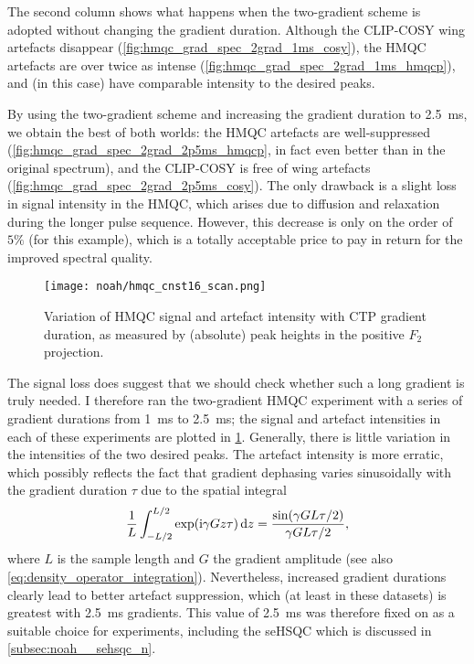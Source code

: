 The second column shows what happens when the two-gradient scheme is adopted without changing the gradient duration.
Although the CLIP-COSY wing artefacts disappear (\cref{fig:hmqc_grad_spec_2grad_1ms_cosy}), the HMQC artefacts are over twice as intense (\cref{fig:hmqc_grad_spec_2grad_1ms_hmqcp}), and (in this case) have comparable intensity to the desired peaks.

By using the two-gradient scheme and increasing the gradient duration to \qty{2.5}{\ms}, we obtain the best of both worlds: the HMQC artefacts are well-suppressed (\cref{fig:hmqc_grad_spec_2grad_2p5ms_hmqcp}, in fact even better than in the original spectrum), and the CLIP-COSY is free of wing artefacts (\cref{fig:hmqc_grad_spec_2grad_2p5ms_cosy}).
The only drawback is a slight loss in signal intensity in the HMQC, which arises due to diffusion and relaxation during the longer pulse sequence.
However, this decrease is only on the order of $5\%$ (for this example), which is a totally acceptable price to pay in return for the improved spectral quality.

\begin{figure}[!ht]
    \centering
    \texttt{[image: noah/hmqc\_cnst16\_scan.png]}%
    \caption[Variation of HMQC signal and artefact intensity with CTP gradient duration]{
        Variation of HMQC signal and artefact intensity with CTP gradient duration, as measured by (absolute) peak heights in the positive $F_2$ projection.
    }
    \label{fig:hmqc_cnst16}
\end{figure}

The signal loss does suggest that we should check whether such a long gradient is truly needed.
I therefore ran the two-gradient HMQC experiment with a series of gradient durations from \qty{1}{\ms} to \qty{2.5}{\ms}; the signal and artefact intensities in each of these experiments are plotted in \cref{fig:hmqc_cnst16}.
Generally, there is little variation in the intensities of the two desired peaks.
The artefact intensity is more erratic, which possibly reflects the fact that gradient dephasing varies sinusoidally with the gradient duration $\tau$ due to the spatial integral
\begin{equation}
    \label{eq:gradient_dephasing}
    \frac{1}{L} \int_{-L/2}^{L/2} \exp(\mathrm{i} \gamma Gz\tau)\,\mathrm{d}z = \frac{\sin(\gamma G L\tau/2)}{\gamma GL\tau/2},
\end{equation}
where $L$ is the sample length and $G$ the gradient amplitude (see also \cref{eq:density_operator_integration}).
Nevertheless, increased gradient durations clearly lead to better artefact suppression, which (at least in these datasets) is greatest with \qty{2.5}{\ms} gradients.
This value of \qty{2.5}{\ms} was therefore fixed on as a suitable choice for \nitrogen{} experiments, including the seHSQC which is discussed in \cref{subsec:noah__sehsqc_n}.



